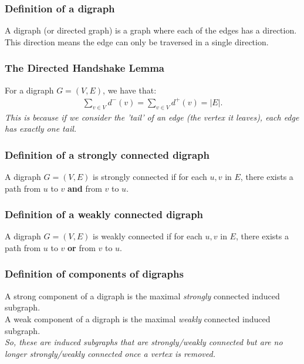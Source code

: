 \documentclass[a4paper, 12pt, twoside]{article}
\begin{document}
\subsubsection{Definition of a digraph}

A digraph (or directed graph) is a graph where each of the edges
has a direction. This direction means the edge can only be traversed
in a single direction.

\subsubsection{The Directed Handshake Lemma}

For a digraph $G = (V, E)$, we have that: \begin{gather*}
  \sum_{v \in V} d^-(v) = \sum_{v \in V} d^+(v) = |E|.
\end{gather*} \textit{This is because if we consider the 'tail' of an
edge (the vertex it leaves), each edge has exactly one tail.}

\subsubsection{Definition of a strongly connected digraph}

A digraph $G = (V, E)$ is strongly connected if for each $u, v$
in $E$, there exists a path from $u$ to $v$ \textbf{and} 
from $v$ to $u$.

\subsubsection{Definition of a weakly connected digraph}

A digraph $G = (V, E)$ is weakly connected if for each $u, v$
in $E$, there exists a path from $u$ to $v$ \textbf{or} 
from $v$ to $u$.

\subsubsection{Definition of components of digraphs}

A strong component of a digraph is the maximal \textit{strongly}
connected induced subgraph.
\\[\baselineskip]
A weak component of a digraph is the maximal \textit{weakly}
connected induced subgraph.
\\[\baselineskip]
\textit{So, these are induced subgraphs that are strongly/weakly
connected but are no longer strongly/weakly connected once a
vertex is removed.}
\end{document}
